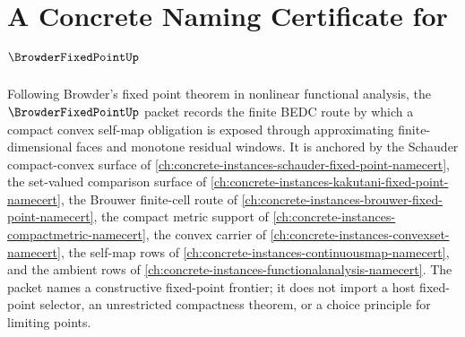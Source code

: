 \chapter{A Concrete Naming Certificate for $\BrowderFixedPointUp$}
\label{ch:concrete-instances-browder-fixed-point-namecert}

Following Browder's fixed point theorem in nonlinear functional analysis, the $\BrowderFixedPointUp$ packet records the finite BEDC route by which a compact convex self-map obligation is exposed through approximating finite-dimensional faces and monotone residual windows. It is anchored by the Schauder compact-convex surface of \autoref{ch:concrete-instances-schauder-fixed-point-namecert}, the set-valued comparison surface of \autoref{ch:concrete-instances-kakutani-fixed-point-namecert}, the Brouwer finite-cell route of \autoref{ch:concrete-instances-brouwer-fixed-point-namecert}, the compact metric support of \autoref{ch:concrete-instances-compactmetric-namecert}, the convex carrier of \autoref{ch:concrete-instances-convexset-namecert}, the self-map rows of \autoref{ch:concrete-instances-continuousmap-namecert}, and the ambient rows of \autoref{ch:concrete-instances-functionalanalysis-namecert}. The packet names a constructive fixed-point frontier; it does not import a host fixed-point selector, an unrestricted compactness theorem, or a choice principle for limiting points.

